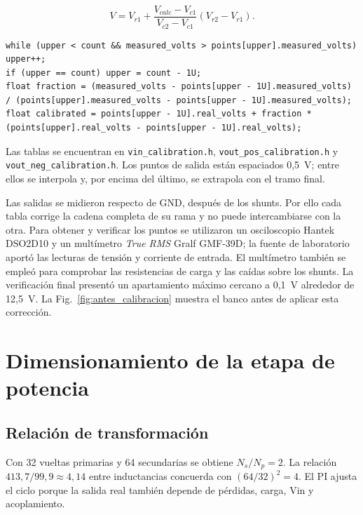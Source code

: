 \documentclass[conference]{IEEEtran}
\begin{document}
\begin{equation}
V=V_{r1}+\frac{V_{calc}-V_{c1}}{V_{c2}-V_{c1}}(V_{r2}-V_{r1}).
\label{eq:interpolacion}
\end{equation}

\begin{lstlisting}[caption={Interpolación lineal utilizada por las tablas de salida.}]
while (upper < count && measured_volts > points[upper].measured_volts) upper++;
if (upper == count) upper = count - 1U;
float fraction = (measured_volts - points[upper - 1U].measured_volts) / (points[upper].measured_volts - points[upper - 1U].measured_volts);
float calibrated = points[upper - 1U].real_volts + fraction * (points[upper].real_volts - points[upper - 1U].real_volts);
\end{lstlisting}

Las tablas se encuentran en \texttt{vin\_calibration.h}, \texttt{vout\_pos\_calibration.h} y \texttt{vout\_neg\_calibration.h}. Los puntos de salida están espaciados 0,5~V; entre ellos se interpola y, por encima del último, se extrapola con el tramo final.

Las salidas se midieron respecto de GND, después de los shunts. Por ello cada tabla corrige la cadena completa de su rama y no puede intercambiarse con la otra. Para obtener y verificar los puntos se utilizaron un osciloscopio Hantek DSO2D10 y un multímetro \textit{True RMS} Gralf GMF-39D; la fuente de laboratorio aportó las lecturas de tensión y corriente de entrada. El multímetro también se empleó para comprobar las resistencias de carga y las caídas sobre los shunts. La verificación final presentó un apartamiento máximo cercano a 0,1~V alrededor de 12,5~V. La Fig.~\ref{fig:antes_calibracion} muestra el banco antes de aplicar esta corrección.

\section{Dimensionamiento de la etapa de potencia}

\subsection{Relación de transformación}

Con 32 vueltas primarias y 64 secundarias se obtiene $N_s/N_p=2$. La relación $413,7/99,9\approx4,14$ entre inductancias concuerda con $(64/32)^2=4$. El PI ajusta el ciclo porque la salida real también depende de pérdidas, carga, Vin y acoplamiento.
\end{document}
